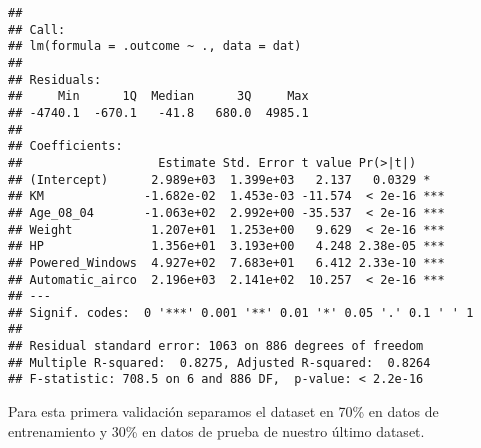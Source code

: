 \documentclass[
]{article}
\newenvironment{Shaded}{\begin{snugshade}}{\end{snugshade}}
\newcommand{\DataTypeTok}[1]{\textcolor[rgb]{0.13,0.29,0.53}{#1}}
\newcommand{\DecValTok}[1]{\textcolor[rgb]{0.00,0.00,0.81}{#1}}
\newcommand{\FloatTok}[1]{\textcolor[rgb]{0.00,0.00,0.81}{#1}}
\newcommand{\KeywordTok}[1]{\textcolor[rgb]{0.13,0.29,0.53}{\textbf{#1}}}
\newcommand{\NormalTok}[1]{#1}
\newcommand{\OperatorTok}[1]{\textcolor[rgb]{0.81,0.36,0.00}{\textbf{#1}}}
\newcommand{\OtherTok}[1]{\textcolor[rgb]{0.56,0.35,0.01}{#1}}
\newcommand{\StringTok}[1]{\textcolor[rgb]{0.31,0.60,0.02}{#1}}
\begin{document}
\begin{Shaded}
\end{Shaded}

\begin{verbatim}
## 
## Call:
## lm(formula = .outcome ~ ., data = dat)
## 
## Residuals:
##     Min      1Q  Median      3Q     Max 
## -4740.1  -670.1   -41.8   680.0  4985.1 
## 
## Coefficients:
##                   Estimate Std. Error t value Pr(>|t|)    
## (Intercept)      2.989e+03  1.399e+03   2.137   0.0329 *  
## KM              -1.682e-02  1.453e-03 -11.574  < 2e-16 ***
## Age_08_04       -1.063e+02  2.992e+00 -35.537  < 2e-16 ***
## Weight           1.207e+01  1.253e+00   9.629  < 2e-16 ***
## HP               1.356e+01  3.193e+00   4.248 2.38e-05 ***
## Powered_Windows  4.927e+02  7.683e+01   6.412 2.33e-10 ***
## Automatic_airco  2.196e+03  2.141e+02  10.257  < 2e-16 ***
## ---
## Signif. codes:  0 '***' 0.001 '**' 0.01 '*' 0.05 '.' 0.1 ' ' 1
## 
## Residual standard error: 1063 on 886 degrees of freedom
## Multiple R-squared:  0.8275, Adjusted R-squared:  0.8264 
## F-statistic: 708.5 on 6 and 886 DF,  p-value: < 2.2e-16
\end{verbatim}

Para esta primera validación separamos el dataset en 70\% en datos de
entrenamiento y 30\% en datos de prueba de nuestro último dataset.

\begin{Shaded}
\end{Shaded}
\end{document}
